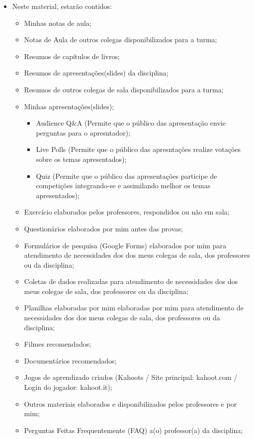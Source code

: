 \documentclass[
]{book}
\providecommand{\tightlist}{%
  \setlength{\itemsep}{0pt}\setlength{\parskip}{0pt}}
\begin{document}
\begin{itemize}
\tightlist
\item
  Neste material, estarão contidos:

  \begin{itemize}
  \tightlist
  \item
    Minhas notas de aula;
  \item
    Notas de Aula de outros colegas disponibilizados para a turma;
  \item
    Resumos de capítulos de livros;
  \item
    Resumos de apresentações(slides) da disciplina;
  \item
    Resumos de outros colegas de sala disponibilizados para a turma;
  \item
    Minhas apresentações(slides);

    \begin{itemize}
    \tightlist
    \item
      Audience Q\&A (Permite que o público das apresentação envie perguntas para o apresntador);
    \item
      Live Polls (Permite que o público das apresntações realize votações sobre os temas apresentados);
    \item
      Quiz (Permite que o público das apresentações participe de competições integrando-se e assimilando melhor os temas apresentados);
    \end{itemize}
  \item
    Exercício elaborados pelos professores, respondidos ou não em sala;
  \item
    Questionários elaborados por mim antes das provas;
  \item
    Formulários de pesquisa (Google Forms) elaborados por mim para atendimento de necessidades dos dos meus colegas de sala, dos professores ou da disciplina;
  \item
    Coletas de dados realizadas para atendimento de necessidades dos dos meus colegas de sala, dos professores ou da disciplina;
  \item
    Planilhas elaboradas por mim elaboradas por mim para atendimento de necessidades dos dos meus colegas de sala, dos professores ou da disciplina;
  \item
    Filmes recomendados;
  \item
    Documentários recomendados;
  \item
    Jogos de aprendizado criados (Kahoots / Site principal: kahoot.com / Login do jogador: kahoot.it);
  \item
    Outros materiais elaborados e disponibilizados pelos professores e por mim;
  \item
    Perguntas Feitas Frequentemente (FAQ) a(o) professor(a) da disciplina;
  \end{itemize}
\end{itemize}
\end{document}
